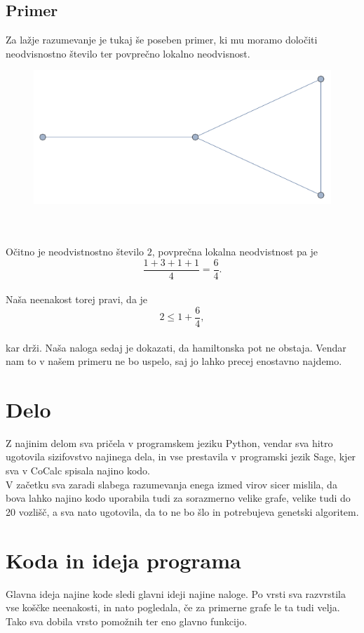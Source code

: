 \documentclass[12pt,a4paper]{amsart}
\theoremstyle{definition} %
\theoremstyle{plain} %
\begin{document}
\subsection{Primer}
Za lažje razumevanje je tukaj še poseben primer, ki mu moramo določiti neodvisnostno število ter povprečno lokalno neodvisnost.\\
\begin{figure}[h]
	\centering
	\includegraphics{slike/grafek}
\end{figure}
\\
\\
Očitno je neodvistnostno število $2$, povprečna lokalna neodvistnost pa je\\ $$\frac{1+3+1+1}{4}=\frac{6}{4}.$$
\ \\
Naša neenakost torej pravi, da je $$2 \leq 1+ \frac{6}{4},$$ 
\\kar drži. Naša naloga sedaj je dokazati, da hamiltonska pot ne obstaja. Vendar nam to v našem primeru ne bo uspelo, saj jo lahko precej enostavno najdemo.
\section{Delo}
Z najinim delom sva pričela v programskem jeziku Python, vendar sva hitro ugotovila sizifovstvo najinega dela, in vse prestavila v programski jezik Sage, kjer sva v CoCalc spisala najino kodo. \\
V začetku sva zaradi slabega razumevanja enega izmed virov sicer mislila, da bova lahko najino kodo uporabila tudi za sorazmerno velike grafe, velike tudi do 20 vozlišč, a sva nato ugotovila, da to ne bo šlo in potrebujeva genetski algoritem.
\section{Koda in ideja programa}
Glavna ideja najine kode sledi glavni ideji najine naloge. Po vrsti sva razvrstila vse koščke neenakosti, in nato pogledala, če za primerne grafe le ta tudi velja. Tako sva dobila vrsto pomožnih ter eno glavno funkcijo.
\end{document}
